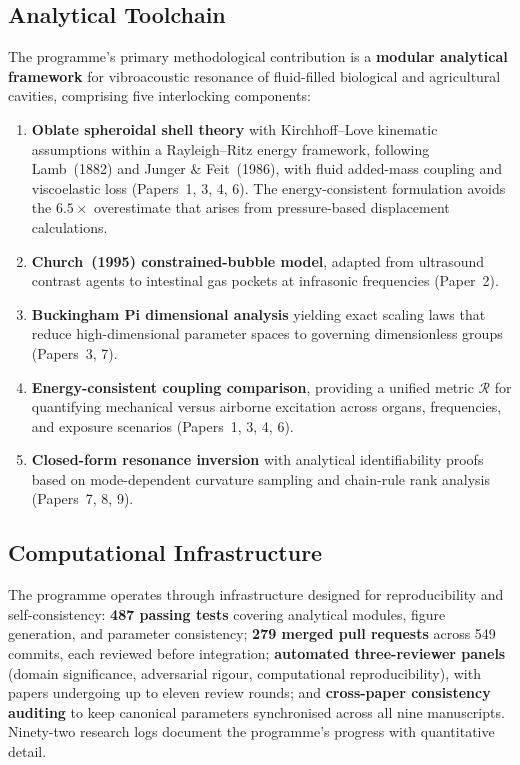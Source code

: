 \documentclass[11pt,a4paper]{article}
\begin{document}
\subsection{Analytical Toolchain}

The programme's primary methodological contribution is a \textbf{modular analytical framework} for vibroacoustic resonance of fluid-filled biological and agricultural cavities, comprising five interlocking components:

\begin{enumerate}[leftmargin=*]
  \item \textbf{Oblate spheroidal shell theory} with Kirchhoff--Love kinematic assumptions within a Rayleigh--Ritz energy framework, following Lamb~(1882) and Junger \& Feit~(1986), with fluid added-mass coupling and viscoelastic loss (Papers~1, 3, 4, 6). The energy-consistent formulation avoids the $6.5\times$ overestimate that arises from pressure-based displacement calculations.
  \item \textbf{Church~(1995) constrained-bubble model}, adapted from ultrasound contrast agents to intestinal gas pockets at infrasonic frequencies (Paper~2).
  \item \textbf{Buckingham Pi dimensional analysis} yielding exact scaling laws that reduce high-dimensional parameter spaces to governing dimensionless groups (Papers~3, 7).
  \item \textbf{Energy-consistent coupling comparison}, providing a unified metric $\mathcal{R}$ for quantifying mechanical versus airborne excitation across organs, frequencies, and exposure scenarios (Papers~1, 3, 4, 6).
  \item \textbf{Closed-form resonance inversion} with analytical identifiability proofs based on mode-dependent curvature sampling and chain-rule rank analysis (Papers~7, 8, 9).
\end{enumerate}

\subsection{Computational Infrastructure}

The programme operates through infrastructure designed for reproducibility and self-consistency: \textbf{487 passing tests} covering analytical modules, figure generation, and parameter consistency; \textbf{279 merged pull requests} across 549 commits, each reviewed before integration; \textbf{automated three-reviewer panels} (domain significance, adversarial rigour, computational reproducibility), with papers undergoing up to eleven review rounds; and \textbf{cross-paper consistency auditing} to keep canonical parameters synchronised across all nine manuscripts. Ninety-two research logs document the programme's progress with quantitative detail.
\end{document}
